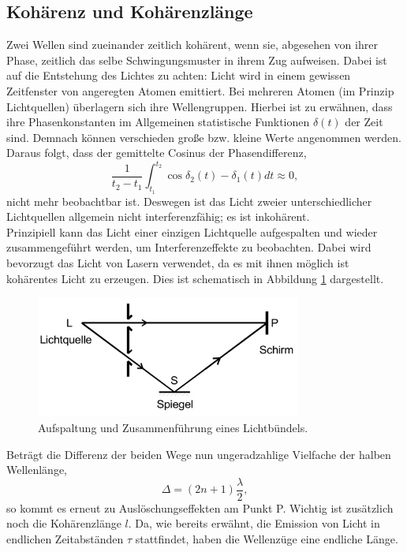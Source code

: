 \subsection{Kohärenz und Kohärenzlänge}
Zwei Wellen sind zueinander zeitlich kohärent, wenn sie, abgesehen von ihrer Phase, zeitlich das selbe Schwingungsmuster in ihrem Zug aufweisen.
Dabei ist auf die Entstehung des Lichtes zu achten:
Licht wird in einem gewissen Zeitfenster von angeregten Atomen emittiert.
Bei mehreren Atomen (im Prinzip Lichtquellen) überlagern sich ihre Wellengruppen.
Hierbei ist zu erwähnen, dass ihre Phasenkonstanten im Allgemeinen statistische Funktionen $\delta(t)$ der Zeit sind.
Demnach können verschieden große bzw. kleine Werte angenommen werden.
Daraus folgt, dass der gemittelte Cosinus der Phasendifferenz,
\begin{equation}
  \frac{1}{t_2-t_1} \int_{t_1}^{t_2} \cos{\delta_2(t)-\delta_1(t)}dt \approx 0,
\end{equation}
nicht mehr beobachtbar ist.
Deswegen ist das Licht zweier unterschiedlicher Lichtquellen allgemein nicht interferenzfähig; es ist inkohärent.\\
Prinzipiell kann das Licht einer einzigen Lichtquelle aufgespalten und wieder zusammengeführt werden, um Interferenzeffekte zu beobachten.
Dabei wird bevorzugt das Licht von Lasern verwendet, da es mit ihnen möglich ist kohärentes Licht zu erzeugen.
Dies ist schematisch in Abbildung \ref{abb:1} dargestellt.
\begin{figure}[H]
  \centering
  \includegraphics[height=4cm]{ressources/spaltung.png}
  \caption{Aufspaltung und Zusammenführung eines Lichtbündels. \cite{Quelle0}}
  \label{abb:1}
\end{figure}
Beträgt die Differenz der beiden Wege nun ungeradzahlige Vielfache der halben Wellenlänge,
\begin{equation}
  \Delta = (2n+1)\frac{\lambda}{2},
\end{equation}
so kommt es erneut zu Auslöschungseffekten am Punkt P.
Wichtig ist zusätzlich noch die Kohärenzlänge $l$.
Da, wie bereits erwähnt, die Emission von Licht in endlichen Zeitabständen $\tau$ stattfindet, haben die Wellenzüge eine endliche Länge.
